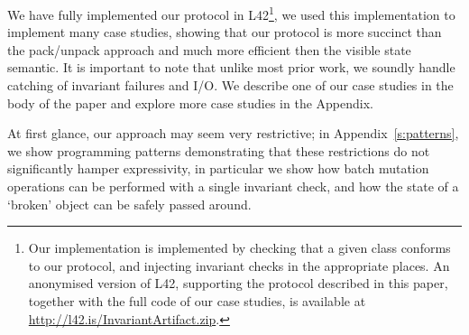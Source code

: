 We have fully implemented our protocol in L42\footnote{
Our implementation is implemented by checking that a given class conforms to our protocol, and injecting invariant checks in the appropriate places.
An anonymised version of L42, supporting the protocol described in this paper, together with the full code of our case studies, is available at \url{http://l42.is/InvariantArtifact.zip}. %
}, we used this implementation to implement many case studies, showing that our protocol is more succinct than the pack/unpack approach and much more efficient then the visible state semantic.
It is important to note that unlike most prior work, we soundly handle catching of invariant failures and I/O.
We describe one of our case studies in the body of the paper and explore more case studies in the Appendix.

At first glance, our approach may seem very restrictive; in Appendix~\ref{s:patterns}, we show
programming patterns demonstrating that these restrictions do not significantly hamper expressivity, in particular we show how batch mutation operations can be performed with a single invariant check, and how the state of a `broken' object can be safely passed around.


